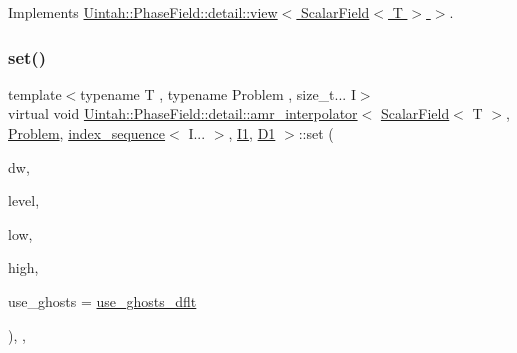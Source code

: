 Implements \hyperlink{classUintah_1_1PhaseField_1_1detail_1_1view_3_01ScalarField_3_01T_01_4_01_4_ae90ea8b33fde8515a1f2e8f5c03c0166}{Uintah\+::\+Phase\+Field\+::detail\+::view$<$ Scalar\+Field$<$ T $>$ $>$}.

\mbox{\label{classUintah_1_1PhaseField_1_1detail_1_1amr__interpolator_3_01ScalarField_3_01T_01_4_00_01Problem71844444bc14a03c0566689b6b502040_af37070317967e41c06604969034c2f71}} 
\subsubsection{\texorpdfstring{set()}{set()}\hspace{0.1cm}{\footnotesize\ttfamily [2/2]}}
{\footnotesize\ttfamily template$<$typename T , typename Problem , size\+\_\+t... I$>$ \\
virtual void \hyperlink{classUintah_1_1PhaseField_1_1detail_1_1amr__interpolator}{Uintah\+::\+Phase\+Field\+::detail\+::amr\+\_\+interpolator}$<$ \hyperlink{structUintah_1_1PhaseField_1_1ScalarField}{Scalar\+Field}$<$ T $>$, \hyperlink{classUintah_1_1PhaseField_1_1Problem}{Problem}, \hyperlink{namespaceUintah_1_1PhaseField_a237de804d99512e50613aff7c94a9461}{index\+\_\+sequence}$<$ I... $>$, \hyperlink{namespaceUintah_1_1PhaseField_a547ce3002aa97fbd3ef3192a6eec8406a66f19efe774b0d2b6e5844eb2d83d305}{I1}, \hyperlink{namespaceUintah_1_1PhaseField_a12bfc68444894dffdf0cb8d9cf0cc76aa24dcc0ba6bcb45bc6f503b1b538c6809}{D1} $>$\+::set (\begin{DoxyParamCaption}\item[{Data\+Warehouse $\ast$}]{dw,  }\item[{const Level $\ast$}]{level,  }\item[{const Int\+Vector \&}]{low,  }\item[{const Int\+Vector \&}]{high,  }\item[{bool}]{use\+\_\+ghosts = {\ttfamily \hyperlink{classUintah_1_1PhaseField_1_1detail_1_1amr__interpolator_3_01ScalarField_3_01T_01_4_00_01Problem71844444bc14a03c0566689b6b502040_ad1c55bf968b88ce13f275aa631a69cf7}{use\+\_\+ghosts\+\_\+dflt}} }\end{DoxyParamCaption})\hspace{0.3cm}{\ttfamily [inline]}, {\ttfamily [override]}, {\ttfamily [virtual]}}



